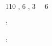 \PreambleSectionTitle{\AbstractTitle}
%
\ThesisSchool
%
%
\begin{doublespace}
\ThesisAuthor

\textbf{\ThesisTitle}
\\
\ThesisSubject
\\
\CurrentYear
\\
110 \TotalPagesWord, 6 \FiguresWord, 3 \TablesWord~\AndWord~6 \AppendicesWord
%
\begin{tabbing}
\ExaminersWord:\quad\= \ThesisFirstExaminer\\
\> \ThesisSupervisor
\end{tabbing}
%
\KeywordsWord: \ThesisKeywords
\end{doublespace}
%
\begin{comment}
FINAL THESIS INSTRUCTIONS.

The abstract is a concise (one A4 sheet), objective, independent summary
of the Master’s thesis. It should be intelligible as such, without the original document. 

It explains the contents of the thesis: the objective, methodologies, results and conclusions. 
A good abstract is written in complete and concise sentences. 
The author does not express his or her opinions, but describes the thesis as would an outside reporter. 
No direct references are made to the original text. 

The abstract is a public document, and therefore all confidential information must be excluded
from it. The abstract is prepared in Finnish and English. 
Both the Finnish and English abstracts are included in the thesis. 

The abstracts are also submitted to the faculty study affairs services as an annex to the assessment 
application of the thesis.
Foreign nationals do not need to prepare an abstract in Finnish.

The author sends electronic copies of the abstracts or the entire thesis to the LUT library. 
More details are available from the library and its web site.

=== 

An abstract is prepared on all Master's theses. You should favour the passive voice or the 3rd
person active in case the abstract is published separately. Unestablished abbreviations, symbols or
technical terms should be explained. Tables, equations etc. are used only if they are necessary for
the sake of clarity. No direct references are made to the original text.


\end{comment}
